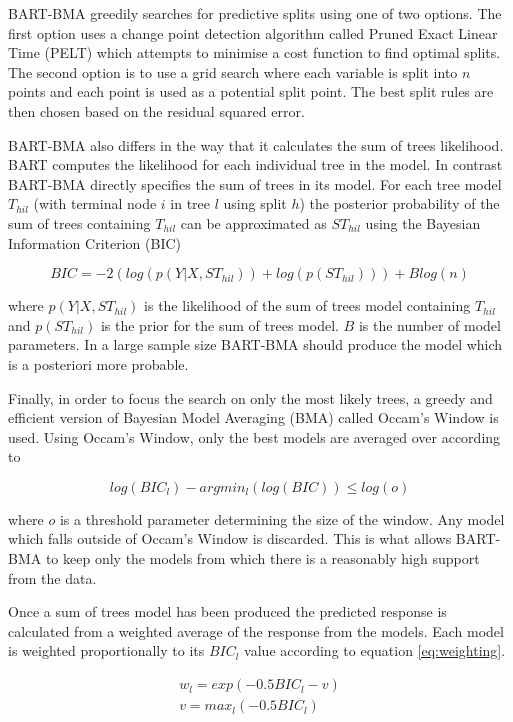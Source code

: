 \documentclass[journal]{IEEEtran}
\begin{document}
BART-BMA greedily searches for predictive splits using one of two options. The first option uses a change point detection algorithm called Pruned Exact Linear Time (PELT) which attempts to minimise a cost function to find optimal splits. The second option is to use a grid search where each variable is split into $n$ points and each point is used as a potential split point. The best split rules are then chosen based on the residual squared error.

BART-BMA also differs in the way that it calculates the sum of trees likelihood. BART computes the likelihood for each individual tree in the model. In contrast BART-BMA directly specifies the sum of trees in its model. For each tree model $T_{hil}$ (with terminal node $i$ in tree $l$ using split $h$) the posterior probability of the sum of trees containing $T_{hil}$ can be approximated as $ST_{hil}$ using the Bayesian Information Criterion (BIC)

\begin{equation}
	BIC = -2(log(p(Y|X,ST_{hil})) + log(p(ST_{hil}))) + B log(n)
\end{equation}

where $p(Y|X,ST_{hil})$ is the likelihood of the sum of trees model containing $T_{hil}$ and $p(ST_{hil})$ is the prior for the sum of trees model. $B$ is the number of model parameters. In a large sample size BART-BMA should produce the model which is a posteriori more probable.

Finally, in order to focus the search on only the most likely trees, a greedy and efficient version of Bayesian Model Averaging (BMA) called Occam's Window is used. Using Occam's Window, only the best models are averaged over according to

\begin{equation}
	log(BIC_l) - argmin_l(log(BIC)) \leq log(o)
\end{equation}

where $o$ is a threshold parameter determining the size of the window. Any model which falls outside of Occam's Window is discarded. This is what allows BART-BMA to keep only the models from which there is a reasonably high support from the data.

Once a sum of trees model has been produced the predicted response is calculated from a weighted average of the response from the models. Each model is weighted proportionally to its $BIC_l$ value according to equation \ref{eq:weighting}.

\begin{equation}
\label{eq:weighting}
\begin{split}
	w_l = exp(-0.5 BIC_l - v)\\
	v = max_l(-0.5 BIC_l)
\end{split}
\end{equation}
\end{document}
